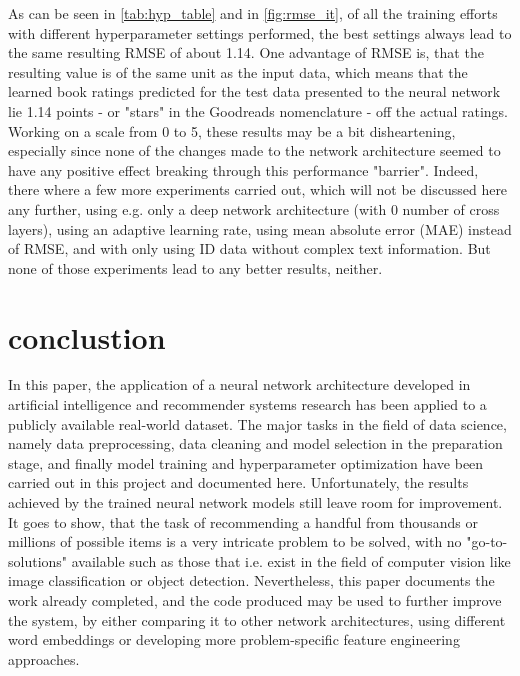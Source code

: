 \documentclass[10pt,final,journal,a4paper,oneside,twocolumn]{IEEEtran}
\begin{document}
As can be seen in \autoref{tab:hyp_table} and in \autoref{fig:rmse_it}, of all the training efforts with different hyperparameter settings performed, the best settings always lead to the same resulting RMSE of about 1.14.
One advantage of RMSE is, that the resulting value is of the same unit as the input data, which means that the learned book ratings predicted for the test data presented to the neural network lie 1.14 points - or "stars" in the Goodreads nomenclature - off the actual ratings.
Working on a scale from 0 to 5, these results may be a bit disheartening, especially since none of the changes made to the network architecture seemed to have any positive effect breaking through this performance "barrier". Indeed, there where a few more experiments carried out, which will not be discussed here any further, using e.g. only a deep network architecture (with 0 number of cross layers), using an adaptive learning rate, using mean absolute error (MAE) instead of RMSE, and with only using ID data without complex text information. But none of those experiments lead to any better results, neither.


\section{conclustion}
In this paper, the application of a neural network architecture developed in artificial intelligence and recommender systems research has been applied to a publicly available real-world dataset.
The major tasks in the field of data science, namely data preprocessing, data cleaning and model selection in the preparation stage, and finally model training and hyperparameter optimization have been carried out in this project and documented here.
Unfortunately, the results achieved by the trained neural network models still leave room for improvement. It goes to show, that the task of recommending a handful from thousands or millions of possible items is a very intricate problem to be solved, with no "go-to-solutions" available such as those that i.e. exist in the field of computer vision like image classification or object detection. 
Nevertheless, this paper documents the work already completed, and the code produced may be used to further improve the system, by either comparing it to other network architectures, using different word embeddings or developing more problem-specific feature engineering approaches.
\end{document}
